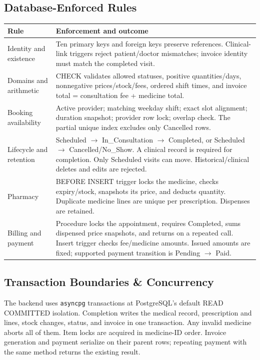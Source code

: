 \documentclass[10pt,a4paper]{article}
\begin{document}
\subsection{Database-Enforced Rules}
{\small
\begin{tabularx}{\linewidth}{@{}p{3.0cm}X@{}}
\toprule \textbf{Rule} & \textbf{Enforcement and outcome}\\\midrule
Identity and existence & Ten primary keys and foreign keys preserve references. Clinical-link triggers reject patient/doctor mismatches; invoice identity must match the completed visit.\\
Domains and arithmetic & CHECK validates allowed statuses, positive quantities/days, nonnegative prices/stock/fees, ordered shift times, and invoice total = consultation fee + medicine total.\\
Booking availability & Active provider; matching weekday shift; exact slot alignment; duration snapshot; provider row lock; overlap check. The partial unique index excludes only Cancelled rows.\\
Lifecycle and retention & Scheduled $\to$ In\_Consultation $\to$ Completed, or Scheduled $\to$ Cancelled/No\_Show. A clinical record is required for completion. Only Scheduled visits can move. Historical/clinical deletes and edits are rejected.\\
Pharmacy & BEFORE INSERT trigger locks the medicine, checks expiry/stock, snapshots its price, and deducts quantity. Duplicate medicine lines are unique per prescription. Dispenses are retained.\\
Billing and payment & Procedure locks the appointment, requires Completed, sums dispensed price snapshots, and returns on a repeated call. Insert trigger checks fee/medicine amounts. Issued amounts are fixed; supported payment transition is Pending $\to$ Paid.\\\bottomrule
\end{tabularx}}

\subsection{Transaction Boundaries \& Concurrency}
The backend uses \texttt{asyncpg} transactions at PostgreSQL's default READ COMMITTED isolation. Completion writes the medical record, prescription and lines, stock changes, status, and invoice in one transaction. Any invalid medicine aborts all of them. Item locks are acquired in medicine-ID order. Invoice generation and payment serialize on their parent rows; repeating payment with the same method returns the existing result.
\end{document}
